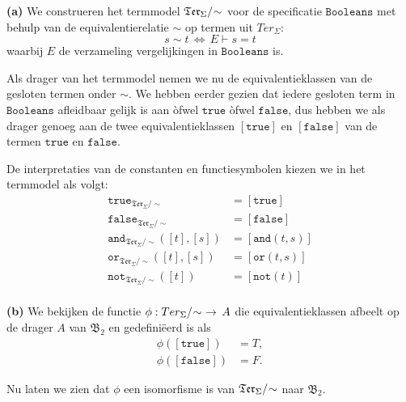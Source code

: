 \documentclass[a4paper,11pt]{article}
\begin{document}
\begin{description}

\item{\bf (a)} %
We construeren het termmodel $\mathfrak{Ter}_{\Sigma}/\negmedspace\sim$ voor de
specificatie $\texttt{Booleans}$ met behulp van de equivalentierelatie $\sim$
op termen uit $Ter_{\Sigma}$:
\begin{displaymath}
s \sim t \, \Longleftrightarrow \, E \vdash s = t
\end{displaymath}
waarbij $E$ de verzameling vergelijkingen in $\texttt{Booleans}$ is.

Als drager van het termmodel nemen we nu de equivalentieklassen van de
gesloten termen onder $\sim$. We hebben eerder gezien dat iedere gesloten term
in $\texttt{Booleans}$ afleidbaar gelijk is aan \`ofwel $\texttt{true}$
\`ofwel $\texttt{false}$, dus hebben we als drager genoeg aan de twee
equivalentieklassen $[\texttt{true}]$ en $[\texttt{false}]$ van de termen
$\texttt{true}$ en $\texttt{false}$.

De interpretaties van de constanten en functiesymbolen kiezen we in het
termmodel als volgt:
\begin{align*}
\texttt{true}_{\mathfrak{Ter}_{\Sigma}/\sim}         &= [\texttt{true}] \\
\texttt{false}_{\mathfrak{Ter}_{\Sigma}/\sim}        &= [\texttt{false}] \\
\texttt{and}_{\mathfrak{Ter}_{\Sigma}/\sim}([t],[s]) &= [\texttt{and}(t,s)] \\
\texttt{or}_{\mathfrak{Ter}_{\Sigma}/\sim}([t],[s])  &= [\texttt{or}(t,s)] \\
\texttt{not}_{\mathfrak{Ter}_{\Sigma}/\sim}([t])     &= [\texttt{not}(t)] \\
\end{align*}

\item{\bf (b)} %
We bekijken de functie $\phi : Ter_{\Sigma}/\negmedspace\sim \,\,
\rightarrow \, A$ die equivalentieklassen afbeelt op de drager $A$ van
$\mathfrak{B}_{2}$ en gedefini\"eerd is als
\begin{align*}
\phi([\texttt{true}])  &= T, \\
\phi([\texttt{false}]) &= F.
\end{align*}

Nu laten we zien dat $\phi$ een isomorfisme is van
$\mathfrak{Ter}_{\Sigma}/\negmedspace\sim$ naar $\mathfrak{B}_{2}$.


\end{description}
\end{document}
